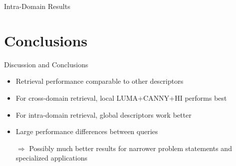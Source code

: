 \documentclass[mathserif]{beamer}
\begin{document}
\begin{frame}{Intra-Domain Results}
    \begin{figure}
        
    \end{figure}
\end{frame}

\section{Conclusions}
\begin{frame}{Discussion and Conclusions}
    \begin{itemize}
        \item Retrieval performance comparable to other descriptors
        \item For cross-domain retrieval, local LUMA+CANNY+HI performs best
        \item For intra-domain retrieval, global descriptors work better
        \item Large performance differences between queries
        \item[$\Rightarrow$] Possibly much better results for narrower problem statements and specialized applications
    \end{itemize}
\end{frame}

\end{document}

